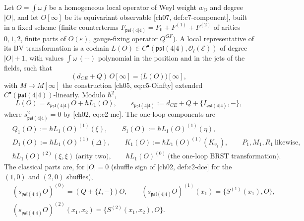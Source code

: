 \begin{definition}
\label{def:o-comp}
Let $O=\int\omega\,f$ be a homogeneous local operator of Weyl weight $w_O$ and degree $|O|$, and let $O[\infty]$ be its equivariant observable [ch07, def:c7-component], built in a fixed scheme (finite counterterms $F_{\mathfrak{psl}(4|4)}=F_0+F^{(1)}+F^{(2)}$ of arities $0,1,2$, finite parts of $O(\varepsilon)$, gauge-fixing operator $Q^{GF}$). A local representative of its BV transformation is a cochain $L(O)\in C^\bullet(\mathfrak{psl}(4|4),\mathscr O_l(\mathscr E))$ of degree $|O|+1$, with values $\int\omega\,(\cdots)$ polynomial in the position and in the jets of the fields, such that
\begin{equation}
(d_{CE}+Q)\,O[\infty]=\big(L(O)\big)[\infty],
\label{eq:o-rep}
\end{equation}
with $M\mapsto M[\infty]$ the construction [ch05, eq:c5-Oinfty] extended $C^\bullet(\mathfrak{psl}(4|4))$-linearly. Modulo $\hbar^2$,
\begin{equation}
L(O)=s_{\mathfrak{psl}(4|4)}O+\hbar L_1(O),\qquad s_{\mathfrak{psl}(4|4)}:=d_{CE}+Q+\{I_{\mathfrak{psl}(4|4)},-\},
\label{eq:o-L1}
\end{equation}
where $s_{\mathfrak{psl}(4|4)}^2=0$ by [ch02, eq:c2-mc]. The one-loop components are
\[
\begin{aligned}
&Q_1(O):=\hbar L_1(O)^{(1)}(\xi),\qquad S_1(O):=\hbar L_1(O)^{(1)}(\eta),\\
&D_1(O):=\hbar L_1(O)^{(1)}(\Delta),\qquad K_1(O):=\hbar L_1(O)^{(1)}(K_{v_1}),\qquad P_1,M_1,R_1\ \text{likewise},\\
&\hbar L_1(O)^{(2)}(\xi,\xi)\ \text{(arity two)},\qquad \hbar L_1(O)^{(0)}\ \text{(the one-loop BRST transformation)}.
\end{aligned}
\]
The classical parts are, for $|O|=0$ (shuffle sign of [ch02, def:c2-dce] for the $(1,0)$ and $(2,0)$ shuffles),
\[
\begin{aligned}
&(s_{\mathfrak{psl}(4|4)}O)^{(0)}=(Q+\{I,-\})O,\qquad (s_{\mathfrak{psl}(4|4)}O)^{(1)}(x_1)=\{S^{(1)}(x_1),O\},\\
&(s_{\mathfrak{psl}(4|4)}O)^{(2)}(x_1,x_2)=\{S^{(2)}(x_1,x_2),O\}.
\end{aligned}
\]
\end{definition}

